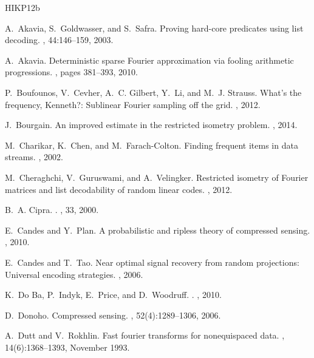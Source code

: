 \documentclass[11pt]{article}
\begin{document}
\newcommand{\etalchar}[1]{$^{#1}$}
\begin{thebibliography}{HIKP12b}

A.~Akavia, S.~Goldwasser, and S.~Safra.
\newblock Proving hard-core predicates using list decoding.
, 44:146--159, 2003.

A.~Akavia.
\newblock Deterministic sparse {F}ourier approximation via fooling arithmetic
  progressions.
, pages 381--393, 2010.

\bibitem[BCG{\etalchar{+}}12]{BCGLS}
P.~Boufounos, V.~Cevher, A.~C. Gilbert, Y.~Li, and M.~J. Strauss.
\newblock What's the frequency, {K}enneth?: Sublinear {F}ourier sampling off
  the grid.
, 2012.

J.~Bourgain.
\newblock An improved estimate in the restricted isometry problem.
, 2014.

M.~Charikar, K.~Chen, and M.~Farach-Colton.
\newblock Finding frequent items in data streams.
, 2002.

M.~Cheraghchi, V.~Guruswami, and A.~Velingker.
\newblock Restricted isometry of {F}ourier matrices and list decodability of
  random linear codes.
, 2012.

B.~A. Cipra.
.
, 33, 2000.

E.~Candes and Y.~Plan.
\newblock A probabilistic and ripless theory of compressed sensing.
, 2010.

E.~Candes and T.~Tao.
\newblock Near optimal signal recovery from random projections: Universal
  encoding strategies.
, 2006.

K.~{Do Ba}, P.~Indyk, E.~Price, and D.~Woodruff.
.
, 2010.

D.~Donoho.
\newblock Compressed sensing.
, 52(4):1289--1306,
  2006.

A.~Dutt and V.~Rokhlin.
\newblock Fast fourier transforms for nonequispaced data.
, 14(6):1368--1393, November 1993.


\end{thebibliography}
\end{document}

